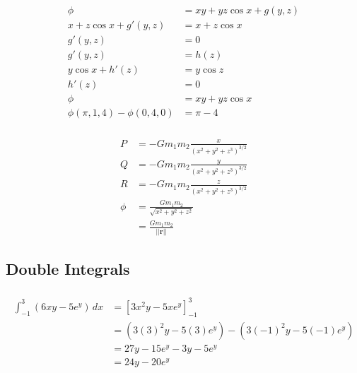 \documentclass{article}
\begin{document}
\begin{align*}
  \phi                            & = x y + y z \cos x + g(y, z) \\
  x + z \cos x + g'(y, z)         & = x + z \cos x               \\
  g'(y, z)                        & = 0                          \\
  g'(y, z)                        & = h(z)                       \\
  y \cos x + h'(z)                & = y \cos z                   \\
  h'(z)                           & = 0                          \\
  \phi                            & = x y + y z \cos x           \\
  \phi(\pi, 1, 4) - \phi(0, 4, 0) & = \pi - 4
\end{align*}

\setcounter{subsubsection}{26}
\subsubsection{}

\begin{align*}
  P    & = -G m_1 m_2 \frac{x}{(x^2 + y^2 + z^3)^{3 / 2}} \\
  Q    & = -G m_1 m_2 \frac{y}{(x^2 + y^2 + z^3)^{3 / 2}} \\
  R    & = -G m_1 m_2 \frac{z}{(x^2 + y^2 + z^3)^{3 / 2}} \\
  \phi & = \frac{G m_1 m_2}{\sqrt{x^2 + y^2 + z^2}}       \\
       & = \frac{G m_1 m_2}{||\mathbf{r}||}
\end{align*}

\subsection{Double Integrals}

\subsubsection{}

\begin{align*}
  \int_{-1}^3 (6 x y - 5 e^y) \,dx & = [3 x^2 y - 5 x e^y]_{-1}^3                          \\
                                   & = (3 (3)^2 y - 5 (3) e^y) - (3 (-1)^2 y - 5 (-1) e^y) \\
                                   & = 27 y - 15 e^y - 3 y - 5 e^y                         \\
                                   & = 24 y - 20 e^y
\end{align*}
\end{document}
